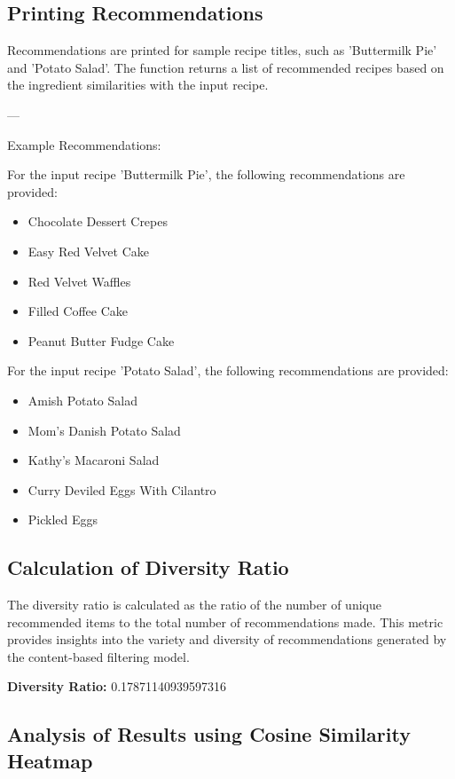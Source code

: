 \documentclass[conference]{IEEEtran}
\begin{document}
\subsection{Printing Recommendations}

Recommendations are printed for sample recipe titles, such as 'Buttermilk Pie' and 'Potato Salad'. The function returns a list of recommended recipes based on the ingredient similarities with the input recipe.

---

Example Recommendations:

For the input recipe 'Buttermilk Pie', the following recommendations are provided:
\begin{itemize}
    \item Chocolate Dessert Crepes
    \item Easy Red Velvet Cake
    \item Red Velvet Waffles
    \item Filled Coffee Cake
    \item Peanut Butter Fudge Cake
\end{itemize}

For the input recipe 'Potato Salad', the following recommendations are provided:
\begin{itemize}
    \item Amish Potato Salad
    \item Mom's Danish Potato Salad
    \item Kathy's Macaroni Salad
    \item Curry Deviled Eggs With Cilantro
    \item Pickled Eggs
\end{itemize}

\subsection{Calculation of Diversity Ratio}

The diversity ratio is calculated as the ratio of the number of unique recommended items to the total number of recommendations made. This metric provides insights into the variety and diversity of recommendations generated by the content-based filtering model.

\textbf{Diversity Ratio:} 0.17871140939597316

\subsection{Analysis of Results using Cosine Similarity Heatmap}
\end{document}
